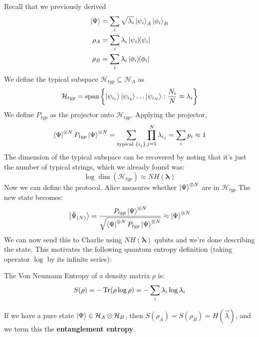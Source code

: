 Recall that we previously derived
\begin{align*}
    \ket{\Psi} &= \sum_i \sqrt{\lambda_i} \ket{\psi_i}_A \ket{\phi_i}_B \\
    \rho_A &= \sum_i \lambda_i \ketbra{\psi_i} \\
    \rho_B &= \sum_i \lambda_i \ketbra{\phi_i}
\end{align*}
We define the typical subspace $\mathcal{H}_{typ} \subseteq \mathcal{H}_A$ as
\[ \mathcal{H}_{typ} = \textrm{span}\left\{ \ket{\psi_{i_1}} \ket{\psi_{i_2}} \dots  \ket{\psi_{i_N}} : \frac{N_i}{N} \approx \lambda_i \right\} \]
We define $P_{typ}$ as the projector onto $\mathcal{H}_{typ}$. Applying the projector,
\[ \bra{\Psi}^{\otimes N} P_{typ} \ket{\Psi}^{\otimes N} = \sum_{\text{typical } \{i_j\} }  \prod_{j = 1}^N \lambda_{i_j} = \sum_{ i} p_i \approx 1 \]
The dimension of the typical subspace can be recovered by noting that it's just the number of typical strings, which we already found was:
\[ \log \dim(\mathcal{H}_{typ}) \approx N H(\mathbf{\lambda}) \]
Now we can define the protocol. Alice measures whether $\ket{\Psi}^{\otimes N}$ are in $\mathcal{H}_{typ}$ The new state becomes:
\[ \ket{\tilde{\Psi}_{(N)}} = \frac{P_{typ} \ket{\Psi}^{\otimes N}}{\sqrt{\bra{\Psi}^{\otimes N} P_{typ} \ket{\Psi}^{\otimes N} }} \approx \ket{\Psi}^{\otimes N}\]
We can now send this to Charlie using $N H(\mathbf{\lambda})$ qubits and we're done describing the state.
This motivates the following quantum entropy definition (taking operator $\log$ by its infinite series):
\begin{definition}
    The Von Neumann Entropy of a density matrix $\rho$ is:
    \[ S(\rho) = -\Tr(\rho \log \rho) = - \sum_i \lambda_i \log \lambda_i\]
\end{definition}
If we have a pure state $\ket{\Psi} \in \mathcal{H}_A \otimes \mathcal{H}_B$, then $S(\rho_A) = S(\rho_B) = H\left(\vec{\lambda}\right)$, and we term this
the \textbf{entanglement entropy}.

